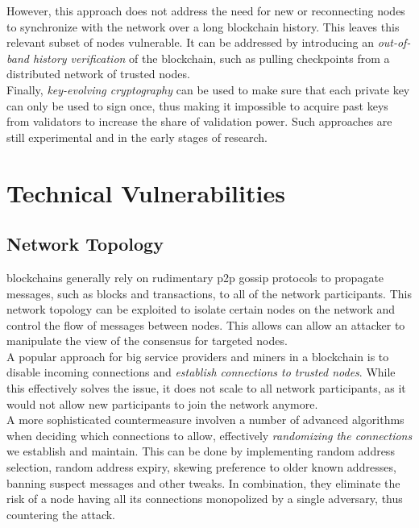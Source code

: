 \documentclass[12pt,a4paper]{article}
\begin{document}
However, this approach does not address the need for new or reconnecting nodes to synchronize with the network over a long blockchain history. This leaves this relevant subset of nodes vulnerable. It can be addressed by introducing an \textit{out-of-band history verification} of the blockchain, such as pulling checkpoints from a distributed network of trusted nodes.\\

Finally, \textit{key-evolving cryptography} can be used to make sure that each private key can only be used to sign once, thus making it impossible to acquire past keys from validators to increase the share of validation power. Such approaches are still experimental and in the early stages of research.\\

\section{Technical Vulnerabilities}

\subsection{Network Topology}

\Glspl{blockchain} generally rely on rudimentary \acrshort{p2p} gossip protocols to propagate messages, such as \glspl{block} and \glspl{transaction}, to all of the network participants. This network topology can be exploited to isolate certain nodes on the network and control the flow of messages between nodes. This allows can allow an attacker to manipulate the view of the \gls{consensus} for targeted nodes.\\

A popular approach for big service providers and \glspl{miner} in a \gls{blockchain} is to disable incoming connections and \textit{establish connections to trusted \glspl{node}}. While this effectively solves the issue, it does not scale to all network participants, as it would not allow new participants to join the network anymore.\\

A more sophisticated countermeasure involven a number of advanced algorithms when deciding which connections to allow, effectively \textit{randomizing the connections} we establish and maintain. This can be done by implementing random address selection, random address expiry, skewing preference to older known addresses, banning suspect messages and other tweaks. In combination, they eliminate the risk of a \gls{node} having all its connections monopolized by a single adversary, thus countering the attack.\\
\end{document}

